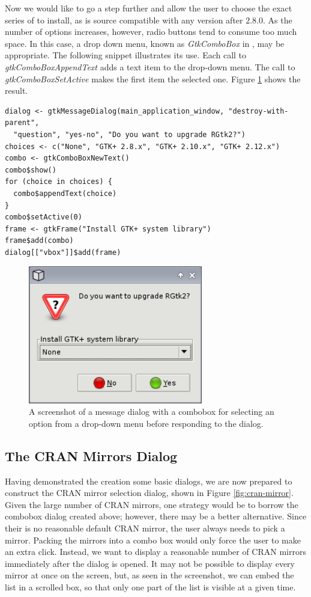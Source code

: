 \documentclass[article]{jss}
\begin{document}
Now we would like to go a step further and allow the user to choose the
exact series of  to install, as  is source compatible with 
any version after $2.8.0$. As the number of options increases, however, radio 
buttons tend to consume too much space. In this case, a drop down menu, known 
as \emph{GtkComboBox} in , may be appropriate. The following snippet 
illustrates its use. Each call to \emph{gtkComboBoxAppendText} adds a text item
to the drop-down menu. The call to \emph{gtkComboBoxSetActive} makes the first 
item the selected one. Figure \ref{fig:combo-dialog} shows the result.
\begin{verbatim}
dialog <- gtkMessageDialog(main_application_window, "destroy-with-parent", 
  "question", "yes-no", "Do you want to upgrade RGtk2?")
choices <- c("None", "GTK+ 2.8.x", "GTK+ 2.10.x", "GTK+ 2.12.x")
combo <- gtkComboBoxNewText()
combo$show()
for (choice in choices) {
  combo$appendText(choice)
}
combo$setActive(0)
frame <- gtkFrame("Install GTK+ system library")
frame$add(combo)
dialog[["vbox"]]$add(frame)
\end{verbatim}

\begin{figure}
\begin{center}
\includegraphics[width=3in]{combo-dialog.png}
\caption{\label{fig:combo-dialog}A screenshot of a message dialog with a 
combobox for selecting an option from a drop-down menu before responding to
the dialog.}
\end{center}
\end{figure}

\subsection{The CRAN Mirrors Dialog}

Having demonstrated the creation some basic dialogs, we are now prepared to 
construct the CRAN mirror selection dialog, shown
in Figure \ref{fig:cran-mirror}.
Given the large number of CRAN mirrors, one strategy would be to 
borrow the combobox dialog created above; however, there may be a better 
alternative. Since their is no reasonable default CRAN mirror, the user always
needs to pick a mirror. Packing the mirrors into a combo box would only force 
the user to make an extra click. Instead, we want to display a reasonable
number of CRAN mirrors immediately after the dialog is opened. It may
not be possible to display every mirror at once on the screen, but, as seen
in the screenshot, we can embed the list in a scrolled box, so that only
one part of the list is visible at a given time.
\end{document}
